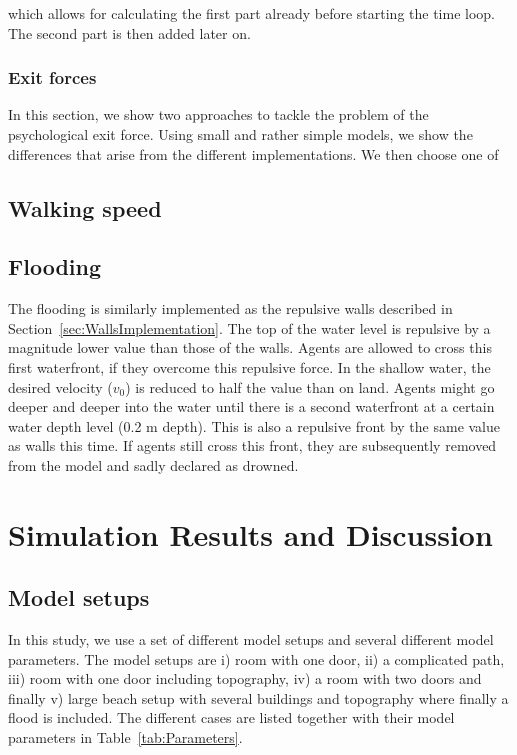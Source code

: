 \documentclass[11pt]{article}
\begin{document}
which allows for calculating the first part already before starting the time loop. The second part is then added later on.

\subsubsection{Exit forces}

In this section, we show two approaches to tackle the problem of the psychological exit force. Using small and rather simple models, we show the differences that arise from the different implementations. We then choose one of

\subsection{Walking speed}


\subsection{Flooding}

The flooding is similarly implemented as the repulsive walls described in Section~\ref{sec:WallsImplementation}. The top of the water level is repulsive by a magnitude lower value than those of the walls. Agents are allowed to cross this first waterfront, if they overcome this repulsive force. In the shallow water, the desired velocity ($v_0$) is reduced to half the value than on land. Agents might go deeper and deeper into the water until there is a second waterfront at a certain water depth level (0.2 m depth). This is also a repulsive front by the same value as walls this time. If agents still cross this front, they are subsequently removed from the model and sadly declared as drowned.

\section{Simulation Results and Discussion}

\subsection{Model setups}

In this study, we use a set of different model setups and several different model parameters. The model setups are i) room with one door, ii) a complicated path, iii) room with one door including topography, iv) a room with two doors and finally v) large beach setup with several buildings and topography where finally a flood is included. The different cases are listed together with their model parameters in Table~\ref{tab:Parameters}.
\end{document}
